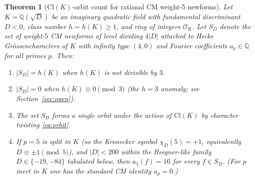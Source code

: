 \documentclass[12pt]{amsart}
\newtheorem{theorem}{Theorem}[section]
\theoremstyle{definition}
\newcommand{\Q}{\mathbb{Q}}
\newcommand{\OK}{\mathcal{O}_K}
\newcommand{\ClK}{\mathrm{Cl}(K)}
\begin{document}
\begin{theorem}[Cl$(K)$-orbit count for rational CM weight-5 newforms]
  \label{thm:main}
  Let $K = \Q(\sqrt{D})$ be an imaginary quadratic field with fundamental
  discriminant $D < 0$, class number $h = h(K) \geq 1$, and ring of integers $\OK$.
  Let $S_D$ denote the set of weight-$5$ CM newforms of level dividing $4|D|$
  attached to Hecke Gr\"ossencharacters of $K$ with infinity type $(4,0)$ and
  Fourier coefficients $a_p \in \Q$ for all primes $p$.
  Then:
  \begin{enumerate}
  \item[\textup{(a)}] $|S_D| = h(K)$ when $h(K)$ is not divisible by $3$.
  \item[\textup{(b)}] $|S_D| = 0$ when $h(K) \equiv 0 \pmod{3}$
    (the \emph{$h=3$ anomaly}; see Section~\ref{sec:open}).
  \item[\textup{(c)}] The set $S_D$ forms a single orbit under the action of
    $\ClK$ by character twisting \eqref{eq:orbit}.
  \item[\textup{(d)}] If $p = 5$ is \emph{split} in $K$ (so the Kronecker
    symbol $\chi_D(5) = +1$, equivalently $D \equiv \pm 1 \pmod 5$),
    and $|D| < 200$ within the Heegner-like family
    $D \in \{-19, -84\}$ tabulated below, then $a_5(f) = 16$ for every
    $f \in S_D$. (For $p$ inert in $K$ one has the standard CM identity
    $a_p = 0$.)
  \end{enumerate}
\end{theorem}
\end{document}
